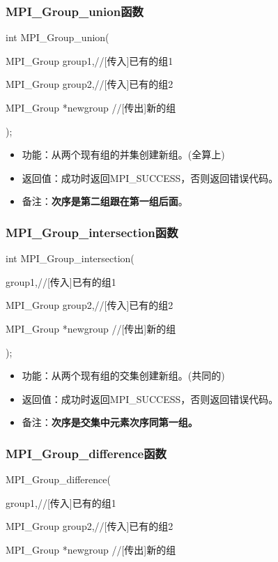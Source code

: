 \documentclass[UTF8]{article}%
\begin{document}
\subsubsection{MPI\_Group\_union函数}

int MPI\_Group\_union(

    \qquad MPI\_Group group1,//[传入]已有的组1

    \qquad MPI\_Group group2,//[传入]已有的组2

    \qquad MPI\_Group *newgroup //[传出]新的组

);

\begin{itemize}
    \item 功能：从两个现有组的并集创建新组。(全算上)
    \item 返回值：成功时返回MPI\_SUCCESS，否则返回错误代码。
    \item 备注：\textbf{次序是第二组跟在第一组后面}。
\end{itemize}

\subsubsection{MPI\_Group\_intersection函数}

int MPI\_Group\_intersection(

    \qquad group1,//[传入]已有的组1

    \qquad MPI\_Group group2,//[传入]已有的组2

    \qquad MPI\_Group *newgroup //[传出]新的组

);

\begin{itemize}
    \item 功能：从两个现有组的交集创建新组。(共同的)
    \item 返回值：成功时返回MPI\_SUCCESS，否则返回错误代码。
    \item 备注：\textbf{次序是交集中元素次序同第一组。}
\end{itemize}

\subsubsection{MPI\_Group\_difference函数}

MPI\_Group\_difference(

    \qquad group1,//[传入]已有的组1

    \qquad MPI\_Group group2,//[传入]已有的组2

    \qquad MPI\_Group *newgroup //[传出]新的组
    
\end{document}
